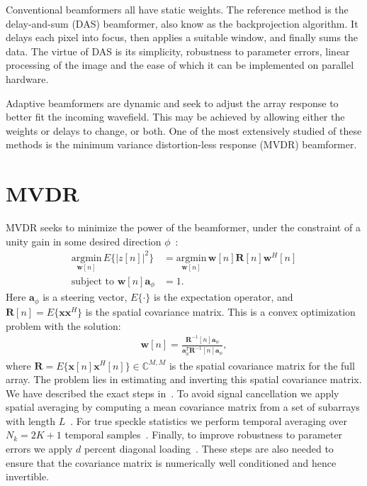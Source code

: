 \documentclass[10pt,journal,draftclsnofoot,onecolumn]{IEEEtran}
\newcommand\nn{\nonumber\\}
\newcommand\argmin[1]{\text{arg}\;\underset{#1}{\text{min}}}
\newcommand\T{^{\scriptscriptstyle T}}
\renewcommand\H{^{\scriptscriptstyle H}}
\renewcommand\vec[1]{\boldsymbol{#1}}
\newcommand\mat[1]{\boldsymbol{#1}}
\newcommand\1{\vec 1}
\renewcommand*\a{\vec a}
\newcommand*\w{\vec w}
\newcommand*\x{\vec x}
\newcommand*\R{\mat R}
\newcommand*\Ri{\R^{-1}}
\renewcommand\argmin{\text{argmin}}
\begin{document}
Conventional beamformers all have static weights. The reference method is the delay-and-sum (DAS) beamformer, also know as the backprojection algorithm. It delays each pixel into focus, then applies a suitable window, and finally sums the data. The virtue of DAS is its simplicity, robustness to parameter errors, linear processing of the image and the ease of which it can be implemented on parallel hardware.

Adaptive beamformers are dynamic and seek to adjust the array response to better fit the incoming wavefield. This may be achieved by allowing either the weights or delays to change, or both. One of the most extensively studied of these methods is the minimum variance distortion-less response (MVDR) beamformer.

\section{MVDR}

MVDR seeks to minimize the power of the beamformer, under the constraint of a unity gain in some desired direction $\phi$~\cite{Capon1969}:
%
\begin{align}
\underset{\w[n]}{\argmin}\, E\{\big|z[n]\big|^2\} &= \underset{\w[n]}{\argmin}\, \w[n]\R[n]\w\H[n]\nn
\text{subject to } \w[n]\a_\phi &= 1.\label{eq_mvdr_definition}
\end{align}
%
Here $\a_\phi$ is a steering vector, $E\{\cdot\}$ is the expectation operator, and $\R[n] = E\{\x\x\H\}$ is the spatial covariance matrix. This is a convex optimization problem with the solution:
%
\begin{gather}
\vec w[n] = \frac{\Ri[n]\a_\phi}{\a_\phi\T\Ri[n]\a_\phi},\label{weights}
\end{gather}
where $\R=E\{\x[n]\x\H[n]\}\in\mathbb{C}^{M,M}$ is the spatial covariance matrix for the full array. The problem lies in estimating and inverting this spatial covariance matrix. We have described the exact steps in~\cite{Buskenes2014}. To avoid signal cancellation we apply spatial averaging by computing a mean covariance matrix from a set of subarrays with length $L$~\cite{Kailath1985}. For true speckle statistics we perform temporal averaging over $N_k = 2K+1$ temporal samples~\cite{Synnevag2009a}. Finally, to improve robustness to parameter errors we apply $d$ percent diagonal loading~\cite{Cox1987,Maksym1979}. These steps are also needed to ensure that the covariance matrix is numerically well conditioned and hence invertible.
\end{document}

